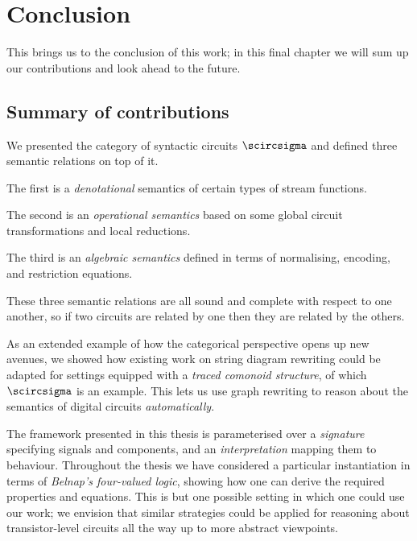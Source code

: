 \chapter{Conclusion}

This brings us to the conclusion of this work; in this final chapter we will sum
up our contributions and look ahead to the future.

\section{Summary of contributions}

We presented the category of syntactic circuits \(\scircsigma\) and defined
three semantic relations on top of it.


The first is a \emph{denotational} semantics of certain types of stream
functions.


The second is an \emph{operational semantics} based on some global
circuit transformations and local reductions.


The third is an
\emph{algebraic semantics} defined in terms of normalising, encoding, and
restriction equations.


These three semantic relations are all sound and complete with respect to one
another, so if two circuits are related by one then they are related by the
others.

As an extended example of how the categorical perspective opens up new avenues,
we showed how existing work on string diagram rewriting could be adapted for
settings equipped with a \emph{traced comonoid structure}, of which
\(\scircsigma\) is an example.
This lets us use graph rewriting to reason about the semantics of digital
circuits \emph{automatically}.



The framework presented in this thesis is parameterised over a
\emph{signature} specifying signals and components, and an
\emph{interpretation} mapping them to behaviour.
Throughout the thesis we have considered a particular instantiation in terms of
\emph{Belnap's four-valued logic}, showing how one can derive the required
properties and equations.
This is but one possible setting in which one could use our work; we envision
that similar strategies could be applied for reasoning about transistor-level
circuits all the way up to more abstract viewpoints.

